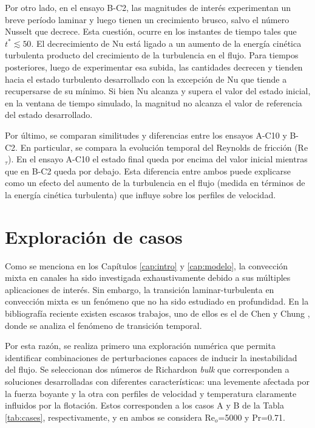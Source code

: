 Por otro lado, en el ensayo B-C2, las magnitudes de interés experimentan un breve período laminar y luego tienen un crecimiento brusco, salvo el número Nusselt que decrece. Esta cuestión, ocurre en los instantes de tiempo tales que $t^*\lesssim 50$. El decrecimiento de Nu está ligado a un aumento de la energía cinética turbulenta producto del crecimiento de la turbulencia en el flujo. Para tiempos posteriores, luego de experimentar esa subida, las cantidades decrecen y tienden hacia el estado turbulento desarrollado con la excepción de Nu que tiende a recupersarse de su mínimo. Si bien Nu alcanza y supera el valor del estado inicial, en la ventana de tiempo simulado, la magnitud no alcanza el valor de referencia del estado desarrollado. 

Por último, se comparan similitudes y diferencias entre los ensayos A-C10 y B-C2. En particular, se compara la evolución temporal del Reynolds de fricción (Re$_{\tau}$). En el ensayo A-C10 el estado final queda por encima del valor inicial mientras que en B-C2 queda por debajo. Esta diferencia entre ambos puede explicarse como un efecto del aumento de la turbulencia en el flujo (medida en términos de la energía cinética turbulenta) que influye sobre los perfiles de velocidad.

\newpage

\section{Exploración de casos} \label{sec:explo}

Como se menciona en los Capítulos \ref{cap:intro} y \ref{cap:modelo}, la convección mixta en canales ha sido investigada exhaustivamente debido a sus múltiples aplicaciones de interés. Sin embargo, la transición laminar-turbulenta en convección mixta es un fenómeno que no ha sido estudiado en profundidad. En la bibliografía reciente existen escasos trabajos, uno de ellos es el de Chen y Chung \cite{chen2003direct}, donde se analiza el fenómeno de transición temporal.

Por esta razón, se realiza primero una exploración numérica que permita identificar combinaciones de perturbaciones capaces de inducir la inestabilidad del flujo. Se seleccionan dos números de Richardson \textit{bulk} que corresponden a soluciones desarrolladas con diferentes características: una levemente afectada por la fuerza boyante y la otra con perfiles de velocidad y temperatura claramente influidos por la flotación. Estos corresponden a los casos A y B de la Tabla \ref{tab:cases}, respectivamente, y en ambos se considera Re$_o$=5000 y Pr=0.71.

